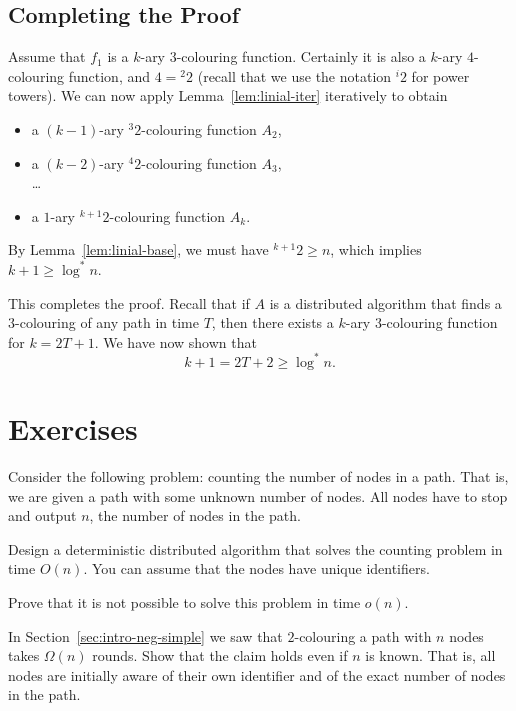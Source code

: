 \subsection{Completing the Proof}

Assume that $f_1$ is a $k$-ary $3$-colouring function. Certainly it is also a $k$-ary $4$-colouring function, and $4 = {}^2 2$ (recall that we use the notation ${}^i 2$ for power towers). We can now apply Lemma~\ref{lem:linial-iter} iteratively to obtain
\begin{itemize}[noitemsep]
    \item a $(k-1)$-ary ${}^3 2$-colouring function $A_2$,
    \item a $(k-2)$-ary ${}^4 2$-colouring function $A_3$, \\ \ldots
    \item a $1$-ary ${}^{k+1} 2$-colouring function $A_k$.
\end{itemize}
By Lemma~\ref{lem:linial-base}, we must have ${}^{k+1} 2 \ge n$, which implies $k + 1 \ge \log^* n$.

This completes the proof. Recall that if $A$ is a distributed algorithm that finds a $3$-colouring of any path in time $T$, then there exists a $k$-ary $3$-colouring function for $k = 2T+1$. We have now shown that
\[
    k + 1 = 2T + 2 \ge \log^* n.
\]


\section{Exercises}

\begin{ex}[counting]
    Consider the following problem: counting the number of nodes in a path. That is, we are given a path with some unknown number of nodes. All nodes have to stop and output $n$, the number of nodes in the path.
    \begin{subex}
        \item Design a deterministic distributed algorithm that solves the counting problem in time $O(n)$. You can assume that the nodes have unique identifiers.
        \item Prove that it is not possible to solve this problem in time $o(n)$.
    \end{subex}
\end{ex}

\begin{ex}[known $n$]
    In Section~\ref{sec:intro-neg-simple} we saw that $2$-colouring a path with $n$ nodes takes $\Omega(n)$    rounds. Show that the claim holds even if $n$ is known. That is, all nodes are initially aware of their own identifier and of the exact number of nodes in the path.
\end{ex}

